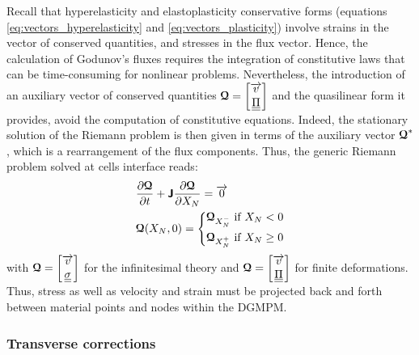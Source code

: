 Recall that hyperelasticity and elastoplasticity conservative forms (equations \eqref{eq:vectors_hyperelasticity} and \eqref{eq:vectors_plasticity}) involve strains in the vector of conserved quantities, and stresses in the flux vector.
Hence, the calculation of Godunov's fluxes requires the integration of constitutive laws that can be time-consuming for nonlinear problems. Nevertheless, the introduction of an auxiliary vector of conserved quantities ${\boldsymbol{\mathcal{Q}}}=\left[\begin{matrix}{\overrightarrow{v}}\\ {\underline{\underline{\Pi}}}\end{matrix}\right]$ and the quasilinear form it provides, avoid the computation of constitutive equations. Indeed, the stationary solution of the Riemann problem is then given in terms of the auxiliary vector ${\boldsymbol{\mathcal{Q}}}^*$, which is a rearrangement of the flux components. Thus, the generic Riemann problem solved at cells interface reads:
\begin{equation}
  \label{eq:RP_quasilinear}
  \begin{aligned}
    &\frac{\partial {\boldsymbol{\mathcal{Q}}}}{\partial t} + \boldsymbol{\mathsf{J}} \frac{\partial {\boldsymbol{\mathcal{Q}}}}{\partial X_N} = {\overrightarrow{0}}  \\
    & {\boldsymbol{\mathcal{Q}}}(X_N,0)= \left\lbrace 
      \begin{aligned}
        & {\boldsymbol{\mathcal{Q}}}_{X_N^-} \text{ if } X_N <0 \\
        & {\boldsymbol{\mathcal{Q}}}_{X_N^{+}} \text{ if } X_N \geq 0
      \end{aligned}
        \right.
  \end{aligned}
\end{equation}
with ${\boldsymbol{\mathcal{Q}}}=\left[\begin{matrix}{\overrightarrow{v}} \\ {\underline{\underline{\sigma}}}\end{matrix}\right]$ for the infinitesimal theory and ${\boldsymbol{\mathcal{Q}}} = \left[\begin{matrix}{\overrightarrow{v}} \\ {\underline{\underline{\Pi}}}\end{matrix}\right]$ for finite deformations. Thus, stress as well as velocity and strain must be projected back and forth between material points and nodes within the DGMPM.

\subsubsection*{Transverse corrections}

